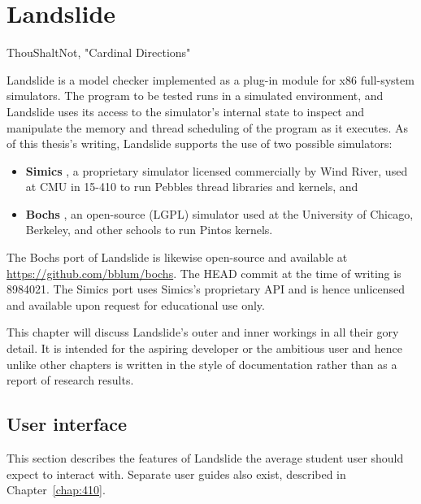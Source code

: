 \chapter{Landslide}
{ThouShaltNot, "Cardinal Directions"}

Landslide is a model checker implemented as a plug-in module for x86 full-system simulators.
The program to be tested runs in a simulated environment,
and Landslide uses its access to the simulator's internal state to inspect and manipulate the memory and thread scheduling of the program as it executes.
As of this thesis's writing, Landslide supports the use of two possible simulators:

\begin{itemize}
	\item {\bf Simics} \cite{simics}, a proprietary simulator licensed commercially by Wind River, used at CMU in 15-410 to run Pebbles thread libraries and kernels, and
	\item {\bf Bochs} \cite{bochs}, an open-source (LGPL) simulator used at the University of Chicago, Berkeley, and other schools to run Pintos kernels.
\end{itemize}

The Bochs port of Landslide is likewise open-source and available at \url{https://github.com/bblum/bochs}.
The HEAD commit at the time of writing is 8984021.
The Simics port uses Simics's proprietary API and is hence unlicensed and available upon request for educational use only.

This chapter will discuss Landslide's outer and inner workings in all their gory detail.
It is intended for the aspiring developer or the ambitious user
and hence unlike other chapters is written in the style of documentation rather than as a report of research results.


\section{User interface}

This section describes the features of Landslide the average student user should expect to interact with.
Separate user guides also exist, described in Chapter~\ref{chap:410}.

